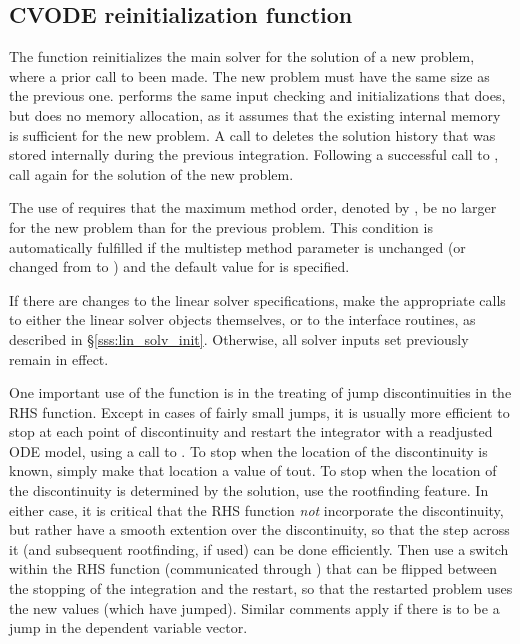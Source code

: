 \subsection{CVODE reinitialization function}\label{sss:cvreinit}

The function  reinitializes the main {\cvode} solver for
the solution of a new problem, where a prior call to 
been made. The new problem must have the same size as the previous one.
 performs the same input checking and initializations
that  does, but does no memory allocation, as it assumes that the
existing internal memory is sufficient for the new problem.
A call to  deletes the solution history that was stored
internally during the previous integration.  Following a successful call to
, call  again for the solution of the new problem.

The use of  requires that the maximum method order, denoted by
, be no larger for the new problem than for the previous problem.
This condition is
automatically fulfilled if the multistep method parameter 
is unchanged (or changed from  to ) and the default
value for  is specified.

If there are changes to the linear solver specifications, make the
appropriate calls to either the linear solver objects themselves, or
to the {\cvls} interface routines, as described in
\S\ref{sss:lin_solv_init}.  Otherwise, all solver inputs set
previously remain in effect.

One important use of the  function is in the treating
of jump discontinuities in the RHS function.  Except in cases of
fairly small jumps, it is usually more efficient to stop at each point
of discontinuity and restart the integrator with a readjusted ODE
model, using a call to .  To stop when the location of
the discontinuity is known, simply make that location a value of tout.
To stop when the location of the discontinuity is determined by the
solution, use the rootfinding feature.  In either case, it is critical
that the RHS function {\it not} incorporate the discontinuity, but
rather have a smooth extention over the discontinuity, so that the
step across it (and subsequent rootfinding, if used) can be done
efficiently.  Then use a switch within the RHS function (communicated
through ) that can be flipped between the stopping of
the integration and the restart, so that the restarted problem uses
the new values (which have jumped).  Similar comments apply if there
is to be a jump in the dependent variable vector.


